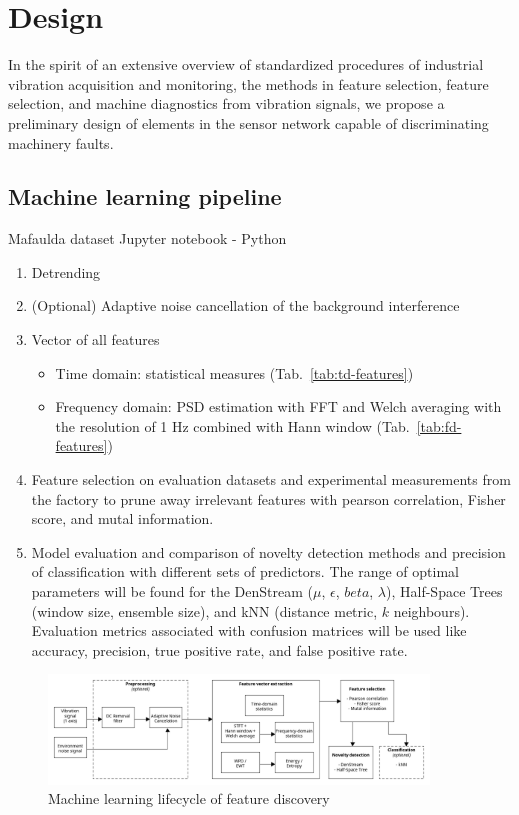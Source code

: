 \chapter{Design} \label{section:design}
In the spirit of an extensive overview of standardized procedures of industrial vibration acquisition and monitoring, the methods in feature selection, feature selection, and machine diagnostics from vibration signals, we propose a preliminary design of elements in the sensor network capable of discriminating machinery faults.

\section{Machine learning pipeline}

Mafaulda dataset
Jupyter notebook - Python
\begin{enumerate}
    \itemsep0pt
    \item Detrending
    \item (Optional) Adaptive noise cancellation of the background interference
    \item Vector of all features
    \begin{itemize}
        \itemsep0pt
        \item Time domain: statistical measures (Tab.~\ref{tab:td-features})
        \item Frequency domain: PSD estimation with FFT and Welch averaging with the resolution of 1 Hz combined with Hann window (Tab.~\ref{tab:fd-features})
    \end{itemize}
    \item Feature selection on evaluation datasets and experimental measurements from the factory to prune away irrelevant features with pearson correlation, Fisher score, and mutal information.
    \item Model evaluation and comparison of novelty detection methods and precision of classification with different sets of predictors. The range of optimal parameters will be found for the DenStream ($\mu$, $\epsilon$, $beta$, $\lambda$), Half-Space Trees (window size, ensemble size), and kNN (distance metric, $k$ neighbours). Evaluation metrics associated with confusion matrices will be used like accuracy, precision, true positive rate, and false positive rate.
\end{enumerate}

\begin{figure}[h]
\centering
\includegraphics[width=0.9\textwidth]{assets/ml-lifecycle.png}
\caption{Machine learning lifecycle of feature discovery}
\end{figure}


